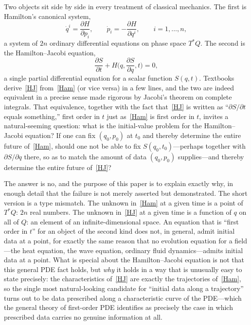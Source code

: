 Two objects sit side by side in every treatment of classical mechanics. The
first is Hamilton's canonical system,
\begin{equation}
\label{Ham}
\dot q^i = \frac{\partial H}{\partial p_i}, \qquad \dot p_i = -\frac{\partial H}{\partial q^i}, \qquad i=1,\dots,n,
\end{equation}
a system of $2n$ ordinary differential equations on phase space $T^*Q$. The
second is the Hamilton--Jacobi equation,
\begin{equation}
\label{HJ}
\frac{\partial S}{\partial t} + H\Big(q,\frac{\partial S}{\partial q},t\Big) = 0,
\end{equation}
a single partial differential equation for a scalar function $S(q,t)$.
Textbooks derive~\eqref{HJ} from~\eqref{Ham} (or vice versa) in a few lines,
and the two are indeed equivalent in a precise sense made rigorous by Jacobi's
theorem on complete integrals. That equivalence, together with the fact
that~\eqref{HJ} is written as ``$\partial S/\partial t$ equals something,''
first order in $t$ just as~\eqref{Ham} is first order in $t$, invites a
natural-seeming question: what is the initial-value problem for the
Hamilton--Jacobi equation? If one can fix $(q_0,p_0)$ at $t_0$ and thereby
determine the entire future of~\eqref{Ham}, should one not be able to fix
$S(q_0,t_0)$---perhaps together with $\partial S/\partial q$ there, so as to
match the amount of data $(q_0,p_0)$ supplies---and thereby determine the
entire future of~\eqref{HJ}?

The answer is no, and the purpose of this paper is to explain exactly why, in
enough detail that the failure is not merely asserted but demonstrated. The
short version is a type mismatch. The unknown in~\eqref{Ham} at a given time is
a point of $T^*Q$: $2n$ real numbers. The unknown in~\eqref{HJ} at a given time
is a function of $q$ on all of $Q$: an element of an infinite-dimensional
space. An equation that is ``first order in $t$'' for an object of the second
kind does not, in general, admit initial data at a point, for exactly the same
reason that no evolution equation for a field---the heat equation, the wave
equation, ordinary fluid dynamics---admits initial data at a point. What is
special about the Hamilton--Jacobi equation is not that this general PDE fact
holds, but \emph{why} it holds in a way that is unusually easy to state
precisely: the characteristics of~\eqref{HJ} are exactly the trajectories
of~\eqref{Ham}, so the single most natural-looking candidate for ``initial data
along a trajectory'' turns out to be data prescribed along a characteristic
curve of the PDE---which the general theory of first-order PDE identifies as
precisely the case in which prescribed data carries no genuine information at
all.


